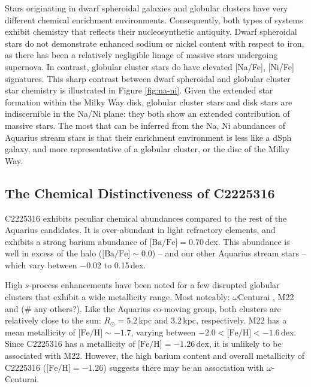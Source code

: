\documentclass{emulateapj}
\begin{document}
Stars originating in dwarf spheroidal galaxies and globular clusters have very different chemical enrichment environments. Consequently, both types of systems exhibit chemistry that reflects their nucleosynthetic antiquity. Dwarf spheroidal stars do not demonstrate enhanced sodium or nickel content with respect to iron, as there has been a relatively negligible linage of massive stars undergoing supernova. In contrast, globular cluster stars do have elevated [Na/Fe], [Ni/Fe] signatures. This sharp contrast between dwarf spheroidal and globular cluster star chemistry is illustrated in Figure \ref{fig:na-ni}. Given the extended star formation within the Milky Way disk, globular cluster stars and disk stars are indiscernible in the Na/Ni plane: they both show an extended contribution of massive stars. The most that can be inferred from the Na, Ni abundances of Aquarius stream stars is that their enrichment environment is less like a dSph galaxy, and more representative of a globular cluster, or the disc of the Milky Way. 



\subsection{The Chemical Distinctiveness of C2225316}


C2225316 exhibits peculiar chemical abundances compared to the rest of the Aquarius candidates. It is over-abundant in light refractory elements, and exhibits a strong barium abundance of $\mbox{[Ba/Fe]} = 0.70$\,dex. This abundance is well in excess of the halo ($\mbox{[Ba/Fe]} \sim 0.0$) \--- and our other Aquarius stream stars \--- which vary between $-$0.02 to 0.15\,dex.

High $s$-process enhancements have been noted for a few disrupted globular clusters that exhibit a wide metallicity range. Most noteably: $\omega$Centurai \citep{majewski;et-al_2012}, M22 \citep{marino;et-al_2011} and (\# any others?). Like the Aquarius co-moving group, both clusters are relatively close to the sun: $R_\odot = 5.2$\,kpc and 3.2\,kpc, respectively. M22 has a mean metallicity of $\mbox{[Fe/H]} \sim -1.7$, varying between $-2.0 < \mbox{[Fe/H]} < -1.6$\,dex. Since C2225316 has a metallicity of $\mbox{[Fe/H]} = -1.26$\,dex, it is unlikely to be associated with M22. However, the high barium content and overall metallicity of C2225316 ($\mbox{[Fe/H]} = -1.26$) suggests there may be an association with $\omega$-Centurai.
\end{document}
